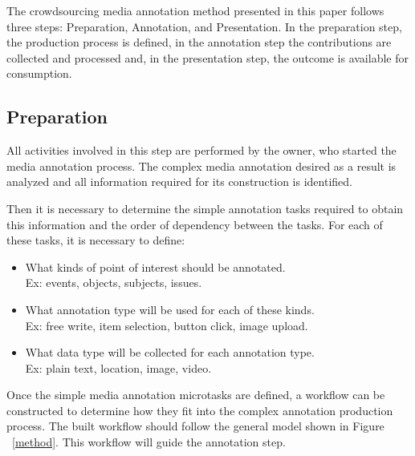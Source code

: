 The crowdsourcing media annotation method presented in this paper follows three steps: Preparation, Annotation, and Presentation. In the preparation step, the production process is defined, in the annotation step the contributions are collected and processed and, in the presentation step, the outcome is available for consumption.

\subsection{Preparation} 
All activities involved in this step are performed by the owner, who started the media annotation process. The complex media annotation desired as a result is analyzed and all information required for its construction is identified.

Then it is necessary to determine the simple annotation tasks required to obtain this information and the order of dependency between the tasks. For each of these tasks, it is necessary to define:
\begin{itemize}
\item What kinds of point of interest should be annotated.\\Ex: events, objects, subjects, issues.
\item What annotation type will be used for each of these kinds.\\Ex: free write, item selection, button click, image upload.
\item What data type will be collected for each annotation type.\\Ex: plain text, location, image, video.
\end{itemize}


Once the simple media annotation microtasks are defined, a workflow can be constructed to determine how they fit into the complex annotation production process. The built workflow should follow the general model shown in Figure ~\ref{method}. This workflow will guide the annotation step.


